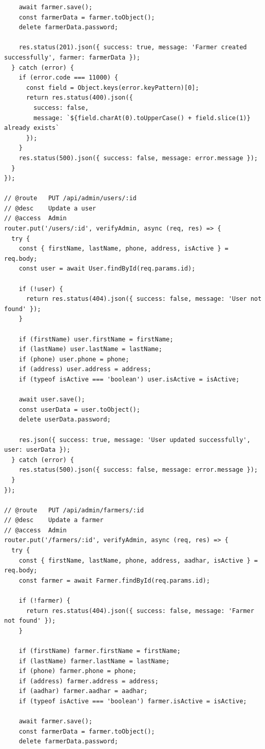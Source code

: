 \documentclass[12pt,a4paper]{report}
\begin{document}
\begin{lstlisting}
    await farmer.save();
    const farmerData = farmer.toObject();
    delete farmerData.password;

    res.status(201).json({ success: true, message: 'Farmer created successfully', farmer: farmerData });
  } catch (error) {
    if (error.code === 11000) {
      const field = Object.keys(error.keyPattern)[0];
      return res.status(400).json({
        success: false,
        message: `${field.charAt(0).toUpperCase() + field.slice(1)} already exists`
      });
    }
    res.status(500).json({ success: false, message: error.message });
  }
});

// @route   PUT /api/admin/users/:id
// @desc    Update a user
// @access  Admin
router.put('/users/:id', verifyAdmin, async (req, res) => {
  try {
    const { firstName, lastName, phone, address, isActive } = req.body;
    const user = await User.findById(req.params.id);

    if (!user) {
      return res.status(404).json({ success: false, message: 'User not found' });
    }

    if (firstName) user.firstName = firstName;
    if (lastName) user.lastName = lastName;
    if (phone) user.phone = phone;
    if (address) user.address = address;
    if (typeof isActive === 'boolean') user.isActive = isActive;

    await user.save();
    const userData = user.toObject();
    delete userData.password;

    res.json({ success: true, message: 'User updated successfully', user: userData });
  } catch (error) {
    res.status(500).json({ success: false, message: error.message });
  }
});

// @route   PUT /api/admin/farmers/:id
// @desc    Update a farmer
// @access  Admin
router.put('/farmers/:id', verifyAdmin, async (req, res) => {
  try {
    const { firstName, lastName, phone, address, aadhar, isActive } = req.body;
    const farmer = await Farmer.findById(req.params.id);

    if (!farmer) {
      return res.status(404).json({ success: false, message: 'Farmer not found' });
    }

    if (firstName) farmer.firstName = firstName;
    if (lastName) farmer.lastName = lastName;
    if (phone) farmer.phone = phone;
    if (address) farmer.address = address;
    if (aadhar) farmer.aadhar = aadhar;
    if (typeof isActive === 'boolean') farmer.isActive = isActive;

    await farmer.save();
    const farmerData = farmer.toObject();
    delete farmerData.password;


\end{lstlisting}
\end{document}
